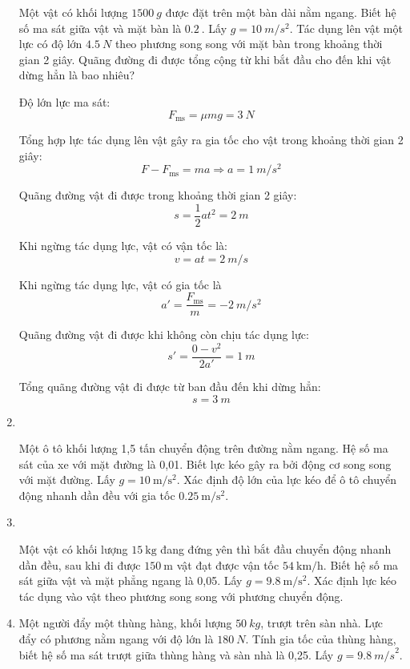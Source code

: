 \begin{enumerate}[label=\bfseries Bài \arabic*:,leftmargin=1.5cm]
	
	{Một vật có khối lượng $\SI{1500}{g}$ được đặt trên một bàn dài nằm ngang. Biết hệ số ma sát giữa vật và mặt bàn là $\SI{0.2}{}$. Lấy $g=\SI{10}{m/s^2}$. Tác dụng lên vật một lực có độ lớn $\SI{4.5}{N}$ theo phương song song với mặt bàn trong khoảng thời gian 2 giây. Quãng đường đi được tổng cộng từ khi bắt đầu cho đến khi vật dừng hẳn là bao nhiêu?
	}
	
	\hideall
	{
		Độ lớn lực ma sát:
		$$F_\text{ms} = \mu mg = \SI{3}{N}$$
		
		Tổng hợp lực tác dụng lên vật gây ra gia tốc cho vật trong khoảng thời gian 2 giây:
		$$F-F_\text{ms} = ma \Rightarrow a = \SI{1}{m/s^2}$$
		
		Quãng đường vật đi được trong khoảng thời gian 2 giây:
		$$s=\dfrac{1}{2}at^2 = \SI{2}{m}$$
		
		Khi ngừng tác dụng lực, vật có vận tốc là:
		$$v=at=\SI{2}{m/s}$$
		
		
		Khi ngừng tác dụng lực, vật có gia tốc là
		$$a'=\dfrac{F_\text{ms}}{m} = \SI{-2}{m/s^2}$$
		
		Quãng đường vật đi được khi không còn chịu tác dụng lực:
		$$s' = \dfrac{0-v^2}{2a'} = \SI{1}{m}$$
		
		Tổng quãng đường vật đi được từ ban đầu đến khi dừng hẳn:
		$$s=\SI{3}{m}$$
	}
	
	
	\item {}\\
	{Một ô tô khối lượng 1,5 tấn chuyển động trên đường nằm ngang. Hệ số ma sát của xe với mặt đường là 0,01. Biết lực kéo gây ra bởi động cơ song song với mặt đường. Lấy $g=\SI{10}{\meter/\second^2}$. Xác định độ lớn của lực kéo để ô tô chuyển động nhanh dần đều với gia tốc $\SI{0.25}{\meter/\second^2}$.
	
}

\item{}\\
{Một vật có khối lượng $\SI{15}{\kilogram}$ đang đứng yên thì bắt đầu chuyển động nhanh dần đều, sau khi đi được $\SI{150}{\meter}$ vật đạt được vận tốc $\SI{54}{\kilo\meter/\hour}$. Biết hệ số ma sát giữa vật và mặt phẳng ngang là 0,05. Lấy $g=\SI{9.8}{\meter/\second^2}$. Xác định lực kéo tác dụng vào vật theo phương song song với phương chuyển động.

}
\item {}

{
	Một người đẩy một thùng hàng, khối lượng $\SI{50}{kg}$, trượt trên sàn nhà. Lực đẩy có phương nằm ngang với độ lớn là $\SI{180}{N}$. Tính gia tốc của thùng hàng, biết hệ số ma sát trượt giữa thùng hàng và sàn nhà là 0,25. Lấy $g = \SI{9,8}{m/s}^2$.
}


\end{enumerate}
